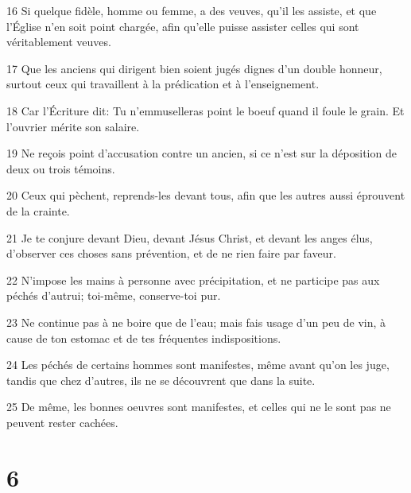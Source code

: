 \par 16 Si quelque fidèle, homme ou femme, a des veuves, qu'il les assiste, et que l'Église n'en soit point chargée, afin qu'elle puisse assister celles qui sont véritablement veuves.
\par 17 Que les anciens qui dirigent bien soient jugés dignes d'un double honneur, surtout ceux qui travaillent à la prédication et à l'enseignement.
\par 18 Car l'Écriture dit: Tu n'emmuselleras point le boeuf quand il foule le grain. Et l'ouvrier mérite son salaire.
\par 19 Ne reçois point d'accusation contre un ancien, si ce n'est sur la déposition de deux ou trois témoins.
\par 20 Ceux qui pèchent, reprends-les devant tous, afin que les autres aussi éprouvent de la crainte.
\par 21 Je te conjure devant Dieu, devant Jésus Christ, et devant les anges élus, d'observer ces choses sans prévention, et de ne rien faire par faveur.
\par 22 N'impose les mains à personne avec précipitation, et ne participe pas aux péchés d'autrui; toi-même, conserve-toi pur.
\par 23 Ne continue pas à ne boire que de l'eau; mais fais usage d'un peu de vin, à cause de ton estomac et de tes fréquentes indispositions.
\par 24 Les péchés de certains hommes sont manifestes, même avant qu'on les juge, tandis que chez d'autres, ils ne se découvrent que dans la suite.
\par 25 De même, les bonnes oeuvres sont manifestes, et celles qui ne le sont pas ne peuvent rester cachées.

\chapter{6}

